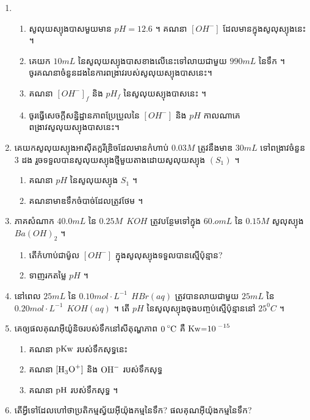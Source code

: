 \documentclass[12pt, a4paper]{article}
\begin{document}
\begin{enumerate}[m]
\begin{enumerate}[k]
	\end{enumerate}
	\item \begin{enumerate}[k]
		\item សូលុយស្យុងបាសមួយមាន $pH=12.6$ ។ គណនា $\left[OH^{-}\right]$ ដែលមានក្នុងសូលុស្យុងនេះ ។
		\item គេយក $10mL$ នៃសូលុយស្យុងបាសខាងលើនេះទៅលាយជាមួយ $990mL$ នៃទឹក ។\\
		ចូរគណនាចំនួនដងនៃការពង្រាវរបស់សូលុយស្យុងបាសនេះ។
		\item គណនា $\left[OH^{-}\right]_{f}$ និង $pH_{f}$ នៃសូលុយស្យុងបាសនេះ ។
		\item ចូរធ្វើសេចក្តីសន្និដ្ឋានភាពប្រែប្រួលនៃ $\left[OH^{-}\right]$ និង $pH$ កាលណាគេពង្រាវសូលុយស្យុងបាសនេះ។ 
	\end{enumerate}
	\item គេយកសូលុយស្យុងអាសុីតក្លរីឌ្រិចដែលមានកំហាប់ $0.03M$ ត្រូវនឹងមាឌ $30mL$ ទៅពង្រាវចំនួន $3$ ដង រួចទទួលបានសូលុយស្យុងថ្មីមួយតាងដោយសូលុយស្យុង $\left(S_{1}\right)$ ។
	\begin{enumerate}[k]
		\item គណនា $pH$ នៃសូលុយស្យុង $S_1$ ។
		\item គណនាមាឌទឹកចំបាច់ដែលត្រូវថែម ។
	\end{enumerate}
	\item ភាគសំណាក $40.0mL$ នៃ $0.25M~~KOH$ ត្រូវបន្ថែមទៅក្នុង $60.omL$ នៃ $0.15M$ សូលុស្យុង $Ba\left(OH\right)_{2}$ ។
	\begin{enumerate}[k]
		\item តើកំហាប់ជាម៉ូល $\left[OH^{-}\right]$ ក្នុងសូលុស្យុងទទួលបានស្មើប៉ុន្មាន?
		\item ទាញរកតម្លៃ $pH$ ។
	\end{enumerate}
	\item នៅពេល $25mL$ នៃ $0.10mol\cdot L^{-1}~~HBr\left(aq\right)$ ត្រូវបានលាយជាមួយ $25mL$ នៃ $0.20mol\cdot L^{-1}~~KOH\left(aq\right)$ ។ តើ $pH$ នៃសូលុស្យុងចុងបញ្ចប់ស្មើប៉ុន្មាននៅ $25^{0}C$ ។
	\item គេឲ្យផលគុណអុីយ៉ូនិចរបស់ទឹកនៅសីតុណ្ហភាព $\ce{0^\circ C}$ គឺ $\ce{Kw=10^{-15}}$
	\begin{enumerate}[k,2]
		\item គណនា $\ce{pKw}$ របស់ទឹកសុទ្ធនេះ
		\item គណនា $\ce{[H3O+]}$ និង $\ce{OH-}$ របស់ទឹកសុទ្ធ
		\item គណនា $\ce{pH}$ របស់ទឹកសុទ្ធ ។
	\end{enumerate}
	\item តើអ្វីទៅដែលហៅថាប្រតិកម្មស្វ័យអុីយ៉ុងកម្មនៃទឹក? ផលគុណអុីយ៉ុងកម្មនៃទឹក?

\end{enumerate}
\end{document}
